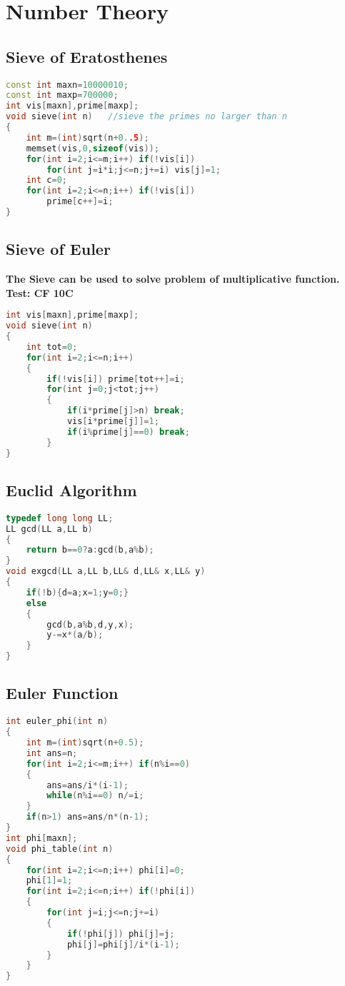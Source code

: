  \section{Number Theory}
  \subsection{Sieve of Eratosthenes}
  \begin{lstlisting}[language=C++]
const int maxn=10000010;
const int maxp=700000;
int vis[maxn],prime[maxp];
void sieve(int n)	//sieve the primes no larger than n
{
	int m=(int)sqrt(n+0..5);
	memset(vis,0,sizeof(vis));
	for(int i=2;i<=m;i++) if(!vis[i])
		for(int j=i*i;j<=n;j+=i) vis[j]=1;
	int c=0;
	for(int i=2;i<=n;i++) if(!vis[i])
		prime[c++]=i;
}
  \end{lstlisting}
  \subsection{Sieve of Euler}
\textbf{The Sieve can be used to solve problem of multiplicative function.\\
Test: CF 10C}
  \begin{lstlisting}[language=C++]
int vis[maxn],prime[maxp];
void sieve(int n)
{
	int tot=0;
	for(int i=2;i<=n;i++)
	{
		if(!vis[i]) prime[tot++]=i;
		for(int j=0;j<tot;j++)
		{
			if(i*prime[j]>n) break;
			vis[i*prime[j]]=1;
			if(i%prime[j]==0) break;
		}
}
  \end{lstlisting}
  \subsection{Euclid Algorithm}
  \begin{lstlisting}[language=C++]
typedef long long LL;
LL gcd(LL a,LL b)
{
	return b==0?a:gcd(b,a%b);
}
void exgcd(LL a,LL b,LL& d,LL& x,LL& y)
{
	if(!b){d=a;x=1;y=0;}
	else
	{
		gcd(b,a%b,d,y,x);
		y-=x*(a/b);
	}
}
  \end{lstlisting}
  \subsection{Euler Function}
  \begin{lstlisting}[language=C++]
int euler_phi(int n)
{
	int m=(int)sqrt(n+0.5);
	int ans=n;
	for(int i=2;i<=m;i++) if(n%i==0)
	{
		ans=ans/i*(i-1);
		while(n%i==0) n/=i;
	}
	if(n>1) ans=ans/n*(n-1);
}
int phi[maxn];
void phi_table(int n)
{
	for(int i=2;i<=n;i++) phi[i]=0;
	phi[1]=1;
	for(int i=2;i<=n;i++) if(!phi[i])
	{
		for(int j=i;j<=n;j+=i)
		{
			if(!phi[j]) phi[j]=j;
			phi[j]=phi[j]/i*(i-1);
		}
	}
}
  \end{lstlisting}
